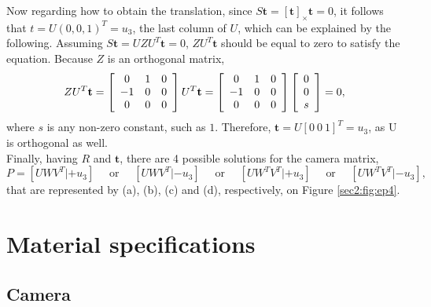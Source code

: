 Now regarding how to obtain the translation, since $S \mathbf{t} = [\mathbf{t}]_{\times}\mathbf{t} = 0$, it follows that $t = U (0, 0, 1)^T = u_3$, the last column of $U$, which can be explained by the following. Assuming $S \mathbf{t} = U Z U^T \mathbf{t} = 0$, $Z U^T \mathbf{t}$ should be equal to zero to satisfy the equation. Because $Z$ is an orthogonal matrix,
\begin{equation}
Z U^T \mathbf{t} = \left[ \begin{array} { c c c } { 0 } & { 1 } & { 0 } \\ { - 1 } & { 0 } & { 0 } \\ { 0 } & { 0 } & { 0 } \end{array} \right] U^T \mathbf{t}  = \left[ \begin{array} { c c c } { 0 } & { 1 } & { 0 } \\ { - 1 } & { 0 } & { 0 } \\ { 0 } & { 0 } & { 0 } \end{array} \right] \left[ \begin{array} { c } { 0 } \\ { 0} \\ s \end{array} \right] = 0,
\end{equation}
where $s$ is any non-zero constant, such as $1$. Therefore, $\mathbf{t} = U [0 \ 0 \ 1]^T = u_3$, as U is orthogonal as well.\\

Finally, having $R$ and $\mathbf{t}$, there are 4 possible solutions for the camera matrix,
\begin{equation}
P = \left[UWV^T | + u_{ 3 } \right] \quad \text { or } \quad \left[ UWV^T | - u_ { 3 } \right] \quad \text { or } \quad \left[ UW^T V^T | + u_ { 3 } \right] \quad \text { or } \quad \left[ UW^T V^T |- u _ { 3 } \right],
\end{equation}
that are represented by (a), (b), (c) and (d), respectively, on Figure \ref{sec2:fig:ep4}. 

\chapter{Material specifications}

\section{Camera}
\label{appendix:cha2:camera}

